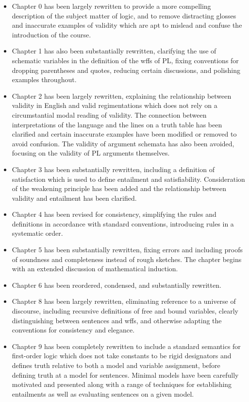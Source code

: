 \begin{itemize}
  \item Chapter 0 has been largely rewritten to provide a more compelling description of the subject matter of logic, and to remove distracting glosses and inaccurate examples of validity which are apt to mislead and confuse the introduction of the course.
  \item Chapter 1 has also been substantially rewritten, clarifying the use of schematic variables in the definition of the wffs of PL, fixing conventions for dropping parentheses and quotes, reducing certain discussions, and polishing examples throughout.
  \item Chapter 2 has been largely rewritten, explaining the relationship between validity in English and valid regimentations which does not rely on a circumstantial modal reading of validity. The connection between interpretations of the language and the lines on a truth table has been clarified and certain inaccurate examples have been modified or removed to avoid confusion. The validity of argument schemata has also been avoided, focusing on the validity of PL arguments themselves.
  \item Chapter 3 has been substantially rewritten, including a definition of satisfaction which is used to define entailment and satisfiability. Consideration of the weakening principle has been added and the relationship between validity and entailment has been clarified. 
  \item Chapter 4 has been revised for consistency, simplifying the rules and definitions in accordance with standard conventions, introducing rules in a systematic order.
  \item Chapter 5 has been substantially rewritten, fixing errors and including proofs of soundness and completeness instead of rough sketches. The chapter begins with an extended discussion of mathematical induction.
  \item Chapter 6 has been reordered, condensed, and substantially rewritten.
  \item Chapter 8 has been largely rewritten, eliminating reference to a universe of discourse, including recursive definitions of free and bound variables, clearly distinguishing between sentences and wffs, and otherwise adapting the conventions for consistency and elegance.
  \item Chapter 9 has been completely rewritten to include a standard semantics for first-order logic which does not take constants to be rigid designators and defines truth relative to both a model and variable assignment, before defining truth at a model for sentences. Minimal models have been carefully motivated and presented along with a range of techniques for establishing entailments as well as evaluating sentences on a given model.

\end{itemize}
